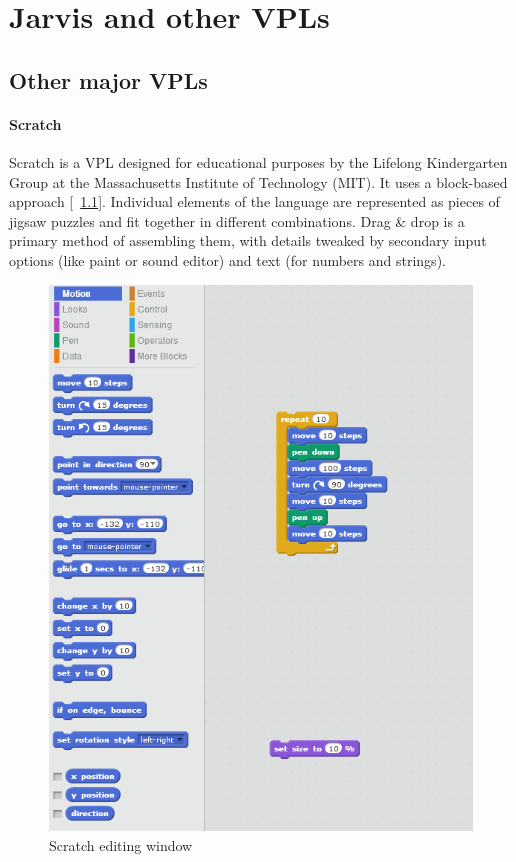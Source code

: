 \documentclass[english,mgr,shortabstract]{iithesis}
\newcommand*{\figref}[1]{[\textbf{\figurename}~\ref{#1}]}
\begin{document}
\chapter{Jarvis and other VPLs}
\section{Other major VPLs}
\subsubsection*{Scratch}
Scratch is a VPL designed for educational purposes by the Lifelong Kindergarten
Group at the Massachusetts Institute of Technology (MIT).
It uses a block-based approach \figref{fig:scratch}.
Individual elements of the language are represented as pieces of jigsaw puzzles
and fit together in different combinations.
Drag \& drop is a primary method of assembling them, with details tweaked by
secondary input options (like paint or sound editor) and text (for numbers and
strings).

\begin{figure}[hbt]
  \centering
  \includegraphics[scale=0.3]{img/s-puzzle}
  \caption{Scratch editing window}
\label{fig:scratch}
\end{figure}
\end{document}
